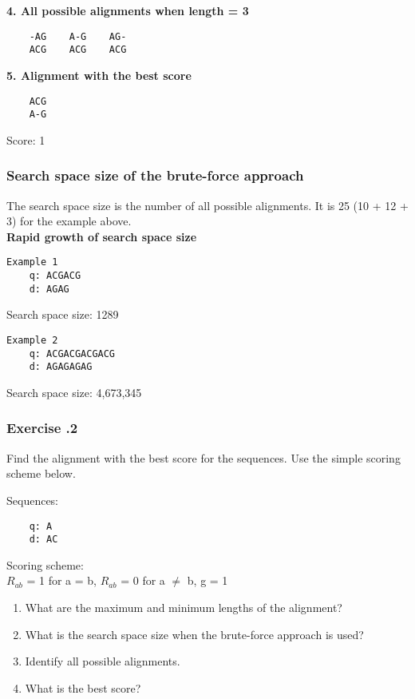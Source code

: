 \noindent \textbf{4. All possible alignments when length = 3}
\begin{verbatim}
    -AG    A-G    AG-
    ACG    ACG    ACG
\end{verbatim}
\medskip

\noindent \textbf{5. Alignment with the best score}
\begin{verbatim}
    ACG
    A-G	
\end{verbatim}

Score: 1

%
%
\subsubsection*{Search space size of the brute-force approach}
The search space size is the number of all possible alignments. It is 25 (10 + 12 + 3) for the example above. \\

\noindent \textbf{Rapid growth of search space size}

\begin{multicols}{2}
\begin{verbatim}
Example 1
    q: ACGACG
    d: AGAG
\end{verbatim}
Search space size: 1289

\begin{verbatim}
Example 2
    q: ACGACGACGACG
    d: AGAGAGAG
\end{verbatim}
Search space size: 4,673,345

\end{multicols}

%
%
\subsubsection*{Exercise \thesection.2}
Find the alignment with the best score for the sequences.  Use the simple scoring scheme below.

\begin{multicols}{2}
Sequences:
\begin{verbatim}
    q: A
    d: AC
\end{verbatim}

\noindent Scoring scheme: \\ $R_{ab}$ = 1 for a = b, $R_{ab}$ = 0 for a $\neq$ b, g = 1
\end{multicols} 

\begin{enumerate}
\item What are the maximum and minimum lengths of the alignment?
\item What is the search space size when the brute-force approach is used?
\item Identify all possible alignments.
\item What is the best score?
\end{enumerate}

%
